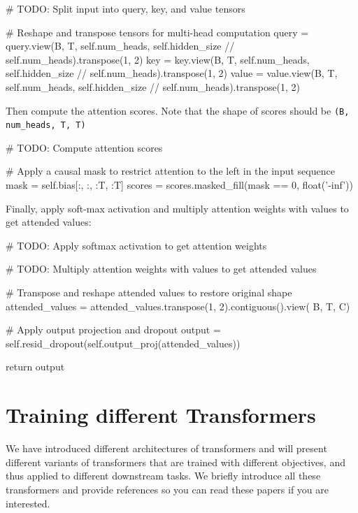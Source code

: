 \begin{exercise}
\begin{enumerate}
\begin{python}
        # TODO: Split input into query, key, and value tensors

        # Reshape and transpose tensors for multi-head computation
        query = query.view(B, T, self.num_heads,
                           self.hidden_size // self.num_heads).transpose(1, 2)
        key = key.view(B, T, self.num_heads,
                       self.hidden_size // self.num_heads).transpose(1, 2)
        value = value.view(B, T, self.num_heads,
                           self.hidden_size // self.num_heads).transpose(1, 2)
\end{python}
Then compute the attention scores. Note that the shape of scores should be {\tt (B, num\_heads, T, T)}
\begin{python}
        # TODO: Compute attention scores

        # Apply a causal mask to restrict attention to the left in the input sequence
        mask = self.bias[:, :, :T, :T]
        scores = scores.masked_fill(mask == 0, float('-inf'))
\end{python}
Finally, apply soft-max activation and multiply attention weights with values to get attended values:
\begin{python}
        # TODO: Apply softmax activation to get attention weights

        # TODO: Multiply attention weights with values to get attended values

        # Transpose and reshape attended values to restore original shape
        attended_values = attended_values.transpose(1, 2).contiguous().view(
            B, T, C)

        # Apply output projection and dropout
        output = self.resid_dropout(self.output_proj(attended_values))

        return output
\end{python}
\end{enumerate}
\end{exercise}

\section{Training different Transformers}
We have introduced different architectures of transformers and will present different variants of transformers that are trained with different objectives, and thus applied to different downstream tasks. We briefly introduce all these transformers and provide references so you can read these papers if you are interested.

